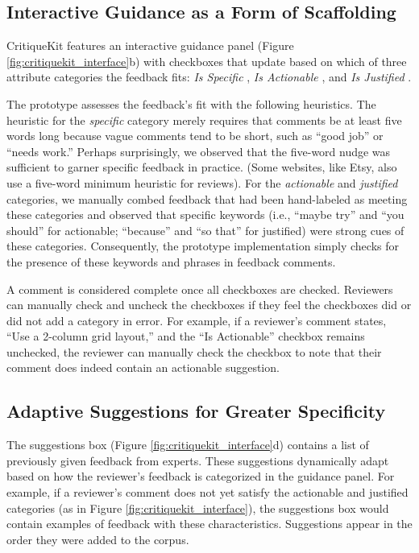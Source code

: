 \subsection{Interactive Guidance as a Form of Scaffolding}
CritiqueKit features an interactive guidance panel (Figure \ref{fig:critiquekit_interface}b) with checkboxes that update based on which of three attribute categories the feedback fits: \textit{Is Specific} \cite{Krause2017, sadler1989formative, sommers1980revision, yuan2016}, \textit{Is Actionable} \cite{Dow2012, Gibbs, Kulkarni2015, Luther2015, sadler1989formative, Tseng2007}, and \textit{Is Justified} \cite{Gielen2010, Krause2017, Narciss2006, yuan2016}. 

The prototype assesses the feedback's fit with the following heuristics. The heuristic for the \textit{specific} category merely requires that comments be at least five words long because vague comments tend to be short, such as ``good job'' or ``needs work.'' Perhaps surprisingly, we observed that the five-word nudge was sufficient to garner specific feedback in practice. (Some websites, like Etsy, also use a five-word minimum heuristic for reviews). For the \textit{actionable} and \textit{justified} categories, we manually combed feedback that had been hand-labeled as meeting these categories and observed that specific keywords (i.e., ``maybe try'' and ``you should'' for actionable; ``because'' and ``so that'' for justified) were strong cues of these categories. Consequently, the prototype implementation simply checks for the presence of these keywords and phrases in feedback comments. 

A comment is considered complete once all checkboxes are checked. Reviewers can manually check and uncheck the checkboxes if they feel the checkboxes did or did not add a category in error. For example, if a reviewer's comment states, ``Use a 2-column grid layout,'' and the ``Is Actionable'' checkbox remains unchecked, the reviewer can manually check the checkbox to note that their comment does indeed contain an actionable suggestion. 

\subsection{Adaptive Suggestions for Greater Specificity}
The suggestions box (Figure \ref{fig:critiquekit_interface}d) contains a list of previously given feedback from experts. These suggestions dynamically adapt based on how the reviewer's feedback is categorized in the guidance panel. For example, if a reviewer's comment does not yet satisfy the actionable and justified categories (as in Figure \ref{fig:critiquekit_interface}), the suggestions box would contain examples of feedback with these characteristics. Suggestions appear in the order they were added to the corpus.

